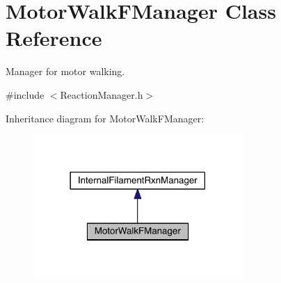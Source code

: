 \hypertarget{classMotorWalkFManager}{\section{Motor\+Walk\+F\+Manager Class Reference}
\label{classMotorWalkFManager}
}


Manager for motor walking.  




{\ttfamily \#include $<$Reaction\+Manager.\+h$>$}



Inheritance diagram for Motor\+Walk\+F\+Manager\+:\nopagebreak
\begin{figure}[H]
\begin{center}
\leavevmode
\includegraphics[width=225pt]{classMotorWalkFManager__inherit__graph}
\end{center}
\end{figure}


